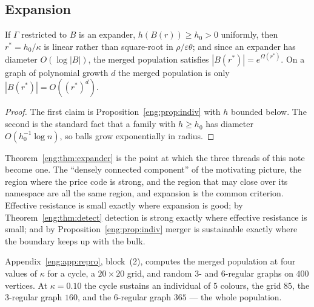 \subsection{Expansion}\label{eng:S8.4}

\begin{theorem}
\label{eng:thm:expander}
If $\Gamma$ restricted to $B$ is an expander, $h(B(r)) \geq h_0 > 0$
uniformly, then $r^\ast = h_0/\kappa$ is linear rather than square-root in
$\rho/\varepsilon\theta$; and since an expander has diameter
$O(\log|B|)$, the merged population satisfies
$|B(r^\ast)| = e^{\Omega(r^\ast)}$. On a graph of polynomial growth $d$ the
merged population is only $|B(r^\ast)| = O((r^\ast)^d)$.
\end{theorem}

\begin{proof}
The first claim is Proposition~\ref{eng:prop:indiv} with $h$ bounded below.
The second is the standard fact that a family with $h \geq h_0$ has
diameter $O(h_0^{-1}\log n)$, so balls grow exponentially in radius.
\end{proof}

Theorem~\ref{eng:thm:expander} is the point at which the three threads of this
note become one. The ``densely connected component'' of the motivating
picture, the region where the price code is strong, and the region that may
close over its namespace are all the same region, and expansion is the
common criterion. Effective resistance is small exactly where expansion is
good; by Theorem~\ref{eng:thm:detect} detection is strong exactly where
effective resistance is small; and by Proposition~\ref{eng:prop:indiv} merger
is sustainable exactly where the boundary keeps up with the bulk.

Appendix~\ref{eng:app:repro}, block~(2), computes the merged population at four
values of $\kappa$ for a cycle, a $20\times 20$ grid, and random $3$- and
$6$-regular graphs on $400$ vertices. At $\kappa = 0.10$ the cycle sustains
an individual of $5$ colours, the grid $85$, the $3$-regular graph $160$,
and the $6$-regular graph $365$ --- the whole population.

